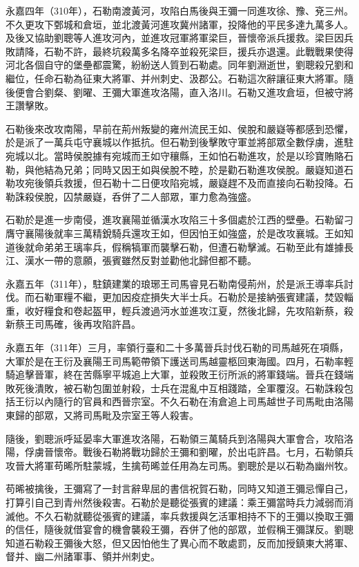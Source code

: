 永嘉四年（310年），石勒南渡黃河，攻陷白馬後與王彌一同進攻徐、豫、兗三州。不久更攻下鄄城和倉垣，並北渡黃河進攻冀州諸軍，投降他的平民多達九萬多人。及後又協助劉聰等人進攻河內，並進攻冠軍將軍梁巨，晉懷帝派兵援救。梁巨因兵敗請降，石勒不許，最終坑殺萬多名降卒並殺死梁巨，援兵亦退還。此戰戰果使得河北各個自守的堡壘都震驚，紛紛送人質到石勒處。同年劉淵逝世，劉聰殺兄劉和繼位，任命石勒為征東大將軍、并州刺史、汲郡公。石勒這次辭讓征東大將軍。隨後便會合劉粲、劉曜、王彌大軍進攻洛陽，直入洛川。石勒又進攻倉垣，但被守將王讚擊敗。

石勒後來改攻南陽，早前在荊州叛變的雍州流民王如、侯脫和嚴嶷等都感到恐懼，於是派了一萬兵屯守襄城以作抵抗。但石勒到後擊敗守軍並將部眾全數俘虜，進駐宛城以北。當時侯脫據有宛城而王如守穰縣，王如怕石勒進攻，於是以珍寶賄賂石勒，與他結為兄弟；同時又因王如與侯脫不睦，於是勸石勒進攻侯脫。嚴嶷知道石勒攻宛後領兵救援，但石勒十二日便攻陷宛城，嚴嶷趕不及而直接向石勒投降。石勒誅殺侯脫，囚禁嚴嶷，呑併了二人部眾，軍力愈為強盛。

石勒於是進一步南侵，進攻襄陽並循漢水攻陷三十多個處於江西的壁壘。石勒留刁膺守襄陽後就率三萬精銳騎兵還攻王如，但因怕王如強盛，於是改攻襄城。王如知道後就命弟弟王璃率兵，假稱犒軍而襲擊石勒，但遭石勒擊滅。石勒至此有雄據長江、漢水一帶的意願，張賓雖然反對並勸他北歸但都不聽。

永嘉五年（311年），駐鎮建業的琅琊王司馬睿見石勒南侵荊州，於是派王導率兵討伐。而石勒軍糧不繼，更加因疫症損失大半士兵。石勒於是接納張賓建議，焚毀輜重，收好糧食和卷起盔甲，輕兵渡過沔水並進攻江夏，然後北歸，先攻陷新蔡，殺新蔡王司馬確，後再攻陷許昌。

永嘉五年（311年）三月，率領行臺和二十多萬晉兵討伐石勒的司馬越死在項縣，大軍於是在王衍及襄陽王司馬範帶領下護送司馬越靈柩回東海國。四月，石勒率輕騎追擊晉軍，終在苦縣寧平城追上大軍，並殺敗王衍所派的將軍錢端。晉兵在錢端敗死後潰敗，被石勒包圍並射殺，士兵在混亂中互相踐踏，全軍覆沒。石勒誅殺包括王衍以內隨行的官員和西晉宗室。不久石勒在洧倉追上司馬越世子司馬毗由洛陽東歸的部眾，又將司馬毗及宗室王等人殺害。

隨後，劉聰派呼延晏率大軍進攻洛陽，石勒領三萬騎兵到洛陽與大軍會合，攻陷洛陽，俘虜晉懷帝。戰後石勒將戰功歸於王彌和劉曜，於出屯許昌。七月，石勒領兵攻晉大將軍苟晞所駐蒙城，生擒苟晞並任用為左司馬。劉聰於是以石勒為幽州牧。

苟晞被擒後，王彌寫了一封言辭卑屈的書信祝賀石勒，同時又知道王彌忌憚自己，打算引自己到青州然後殺害。石勒於是聽從張賓的建議：乘王彌當時兵力減弱而消滅他。不久石勒就聽從張賓的建議，率兵救援與乞活軍相持不下的王彌以換取王彌的信任，隨後就借宴會的機會襲殺王彌，吞併了他的部眾，並假稱王彌謀反。劉聰知道石勒殺王彌後大怒，但又因怕他生了異心而不敢處罰，反而加授鎮東大將軍、督并、幽二州諸軍事、領并州刺史。

